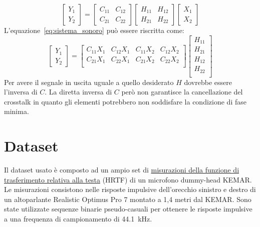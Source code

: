 \documentclass[12pt,a4paper,titlepage]{article}
\begin{document}
\begin{equation}\label{eq:sistema_sonoro}
\begin{bmatrix}
Y_1\\
Y_2
\end{bmatrix}
=
\begin{bmatrix}
C_{11} & C_{12}\\
C_{21} & C_{22}
\end{bmatrix}
\begin{bmatrix}
H_{11} & H_{12}\\
H_{21} & H_{22}
\end{bmatrix}
\begin{bmatrix}
X_1\\
X_2
\end{bmatrix}
\end{equation}
L'equazione~\eqref{eq:sistema_sonoro} può essere riscritta come:
\begin{equation}
\begin{bmatrix}
Y_1\\
Y_2
\end{bmatrix}
=
\begin{bmatrix}
C_{11} X_1 & C_{12} X_1 & C_{11} X_2 & C_{12} X_2 \\ 
C_{21} X_1 & C_{22} X_1 & C_{21} X_2 & C_{22} X_2 \\ 
\end{bmatrix}
\begin{bmatrix}
H_{11}\\
H_{21}\\
H_{12}\\
H_{22}\\
\end{bmatrix}
\end{equation}
Per avere il segnale in uscita uguale a quello desiderato $H$ dovrebbe essere l'inversa di $C$. La diretta inversa di $C$ però non garantisce la cancellazione del crosstalk in quanto gli elementi potrebbero non soddisfare la condizione di fase minima. 
\clearpage

\section{Dataset}
\label{sec:Dataset}
Il dataset usato è composto ad un ampio set di \href{http://sound.media.mit.edu/resources/KEMAR/full.zip}{misurazioni della funzione di trasferimento relativa alla testa} (HRTF) di un microfono dummy-head KEMAR. Le misurazioni consistono nelle risposte impulsive dell'orecchio sinistro e destro di un altoparlante Realistic Optimus Pro 7 montato a 1,4 metri dal KEMAR. Sono state utilizzate sequenze binarie pseudo-casuali per ottenere le risposte impulsive a una frequenza di campionamento di \SI{44.1}{\kilo \hertz}. \cite{Gardner:HRTF}
\end{document}
